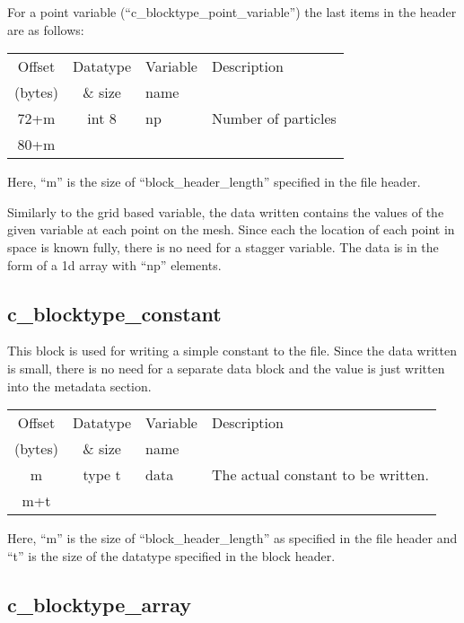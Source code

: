 \documentclass[12pt]{article}
\newcommand{\subsubsec}{\subsection}
\begin{document}
For a point variable (``c\_blocktype\_point\_variable'') the last items in the
header are as follows:\\

\begin{center}
\begin{tabularx}{0.9\textwidth}[!hbt]{cclX}
  Offset & Datatype & Variable & Description\\
  (bytes) & \& size & name &
  \\\toprule

  72+m & int 8 & np & Number of particles
  \\\midrule

  80+m &
\end{tabularx}
\end{center}\vspace{10pt}

Here, ``m'' is the size of ``block\_header\_length'' specified in the file
header.

Similarly to the grid based variable, the data written contains the values of
the given variable at each point on the mesh. Since each the location of
each point in space is known fully, there is no need for a stagger variable.
The data is in the form of a 1d array with ``np'' elements.

\subsubsec{c\_blocktype\_constant}

This block is used for writing a simple constant to the file. Since the
data written is small, there is no need for a separate data block and
the value is just written into the metadata section.\\

\begin{center}
\begin{tabularx}{0.9\textwidth}[!hbt]{cclX}
  Offset & Datatype & Variable & Description\\
  (bytes) & \& size & name &
  \\\toprule

  m & type t & data & The actual constant to be written.
  \\\midrule

  m+t &
\end{tabularx}
\end{center}\vspace{10pt}

Here, ``m'' is the size of ``block\_header\_length'' as specified in the file
header and ``t'' is the size of the datatype specified in the block header.

\subsubsec{c\_blocktype\_array}
\end{document}
